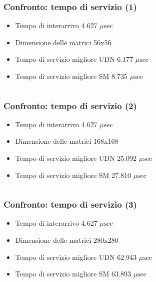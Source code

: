 \documentclass{beamer}
\newcommand{\musec}{$\mu \textrm{sec}$}
\begin{document}
\begin{frame}
  \frametitle{Confronto: tempo di servizio (1)}
  \begin{itemize}
  \item Tempo di interarrivo 4.627 \musec
  \item Dimensione delle matrici 56x56
  \item Tempo di servizio migliore UDN 6.177 \musec
  \item Tempo di servizio migliore SM 8.735 \musec
  \end{itemize}
  \begin{columns}
    \resizebox{\columnwidth}{!}{}
    \resizebox{\columnwidth}{!}{}
  \end{columns}
\end{frame}

\begin{frame}
  \frametitle{Confronto: tempo di servizio (2)}
  \begin{itemize}
  \item Tempo di interarrivo 4.627 \musec %
  \item Dimensione delle matrici 168x168
  \item Tempo di servizio migliore UDN 25.092 \musec
  \item Tempo di servizio migliore SM 27.810 \musec  
  \end{itemize}
  \begin{columns}
    \resizebox{\columnwidth}{!}{}
    \resizebox{\columnwidth}{!}{}
  \end{columns}
\end{frame}

\begin{frame}
  \frametitle{Confronto: tempo di servizio (3)}
  \begin{itemize}
  \item Tempo di interarrivo 4.627 \musec %
  \item Dimensione delle matrici 280x280
  \item Tempo di servizio migliore UDN 62.943 \musec
  \item Tempo di servizio migliore SM 63.893 \musec  
  \end{itemize}
  \begin{columns}
    \resizebox{\columnwidth}{!}{}
    \resizebox{\columnwidth}{!}{}
  \end{columns}
\end{frame}
\end{document}
